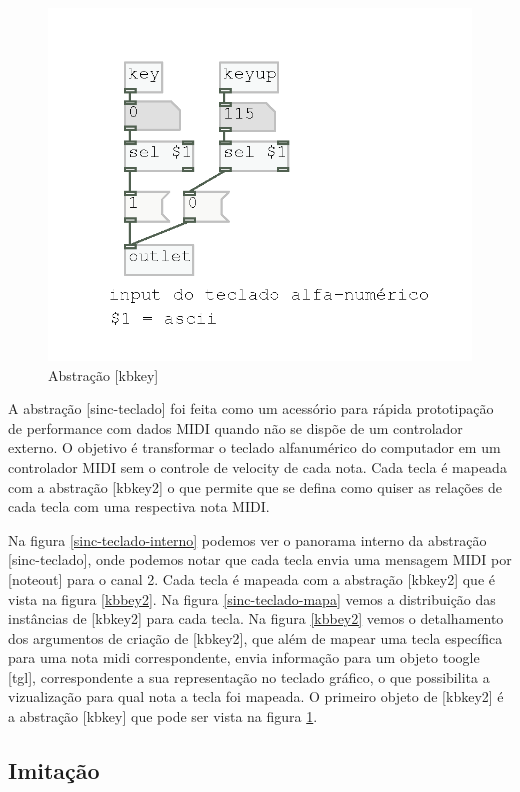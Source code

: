 \documentclass{ppgmus}
\begin{document}
\begin{figure}
\includegraphics[scale=.5]{kbkey}
\caption{Abstração [kbkey]}
\label{kbkey}
\end{figure}


A abstração [sinc-teclado] foi feita como um acessório para rápida prototipação de 
performance com dados MIDI quando não se dispõe de um controlador externo. O objetivo
é transformar o teclado alfanumérico do computador em um controlador MIDI sem o controle de velocity
de cada nota. Cada tecla é mapeada com a abstração [kbkey2] o que permite que se defina como quiser
as relações de cada tecla com uma respectiva nota MIDI.

Na figura \ref{sinc-teclado-interno} podemos ver o panorama interno da abstração [sinc-teclado], onde podemos notar
que cada tecla envia uma mensagem MIDI por [noteout] para o canal 2.
Cada tecla é mapeada com a abstração [kbkey2] que é vista na figura \ref{kbbey2}. 
Na figura \ref{sinc-teclado-mapa} vemos a distribuição das instâncias de [kbkey2] para
cada tecla. Na figura \ref{kbbey2} vemos o detalhamento dos argumentos de criação de [kbkey2], que além de mapear
uma tecla específica para uma nota midi correspondente, envia informação para um objeto toogle [tgl],
correspondente a sua representação no teclado gráfico, o que possibilita a vizualização para qual nota
a tecla foi mapeada. O primeiro objeto de [kbkey2] é a abstração [kbkey] que pode ser vista na figura \ref{kbkey}.




\subsection{Imitação}
\end{document}
